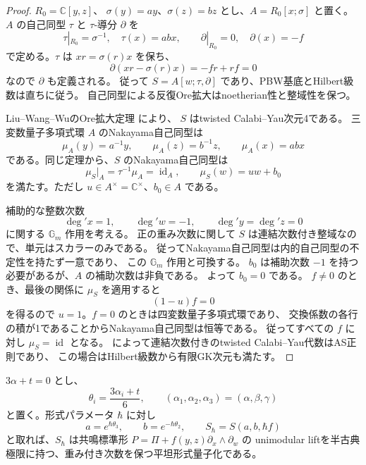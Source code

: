 \begin{proof}
$R_0=\mathbb C[y,z]$、
$\sigma(y)=ay$、$\sigma(z)=bz$ とし、$A=R_0[x;\sigma]$ と置く。
$A$ の自己同型 $\tau$ と $\tau$-導分 $\partial$ を
\[
 \tau|_{R_0}=\sigma^{-1},\quad \tau(x)=abx,
 \qquad \partial|_{R_0}=0,\quad \partial(x)=-f
\]
で定める。$\tau$ は $xr=\sigma(r)x$ を保ち、
\[
 \partial(xr-\sigma(r)x)=-fr+rf=0
\]
なので $\partial$ も定義される。
従って $S=A[w;\tau,\partial]$ であり、PBW基底とHilbert級数は直ちに従う。
自己同型による反復Ore拡大はnoetherian性と整域性を保つ。

Liu--Wang--WuのOre拡大定理\cite[Theorem 3.3]{LWW} により、
$S$ はtwisted Calabi--Yau次元4である。
三変数量子多項式環 $A$ のNakayama自己同型は
\[
 \mu_A(y)=a^{-1}y,\qquad \mu_A(z)=b^{-1}z,
 \qquad \mu_A(x)=abx
\]
である。同じ定理から、$S$ のNakayama自己同型は
\[
 \mu_S|_A=\tau^{-1}\mu_A=\operatorname{id}_A,
 \qquad \mu_S(w)=u w+b_0
\]
を満たす。ただし $u\in A^\times=\mathbb C^\times$、$b_0\in A$ である。

補助的な整数次数
\[
 \deg' x=1,\qquad\deg' w=-1,\qquad\deg' y=\deg' z=0
\]
に関する $\mathbb G_m$ 作用を考える。
正の重み次数に関して $S$ は連結次数付き整域なので、単元はスカラーのみである。
従ってNakayama自己同型は内的自己同型の不定性を持たず一意であり、
この $\mathbb G_m$ 作用と可換する。
$b_0$ は補助次数 $-1$ を持つ必要があるが、$A$ の補助次数は非負である。
よって $b_0=0$ である。
$f\neq0$ のとき、最後の関係に $\mu_S$ を適用すると
\[
 (1-u)f=0
\]
を得るので $u=1$。$f=0$ のときは四変数量子多項式環であり、
交換係数の各行の積が1であることからNakayama自己同型は恒等である。
従ってすべての $f$ に対し $\mu_S=\operatorname{id}$ となる。
\cite[Lemma 1.3]{LWW}によって連結次数付きのtwisted Calabi--Yau代数はAS正則であり、
この場合はHilbert級数から有限GK次元も満たす。
\end{proof}

\begin{corollary}[共鳴成分の半古典極限]
\label{cor:resonance-quantization-v32}
$3\alpha+t=0$ とし、
\[
 \theta_i=\frac{3\alpha_i+t}{6},\qquad
 (\alpha_1,\alpha_2,\alpha_3)=(\alpha,\beta,\gamma)
\]
と置く。形式パラメータ $\hbar$ に対し
\[
 a=e^{\hbar\theta_3},\qquad b=e^{-\hbar\theta_2},\qquad
 S_\hbar=S(a,b,\hbar f)
\]
と取れば、$S_\hbar$ は共鳴標準形
$P=\Pi+f(y,z)\partial_x\wedge\partial_w$ の
unimodular liftを半古典極限に持つ、重み付き次数を保つ平坦形式量子化である。
\end{corollary}


